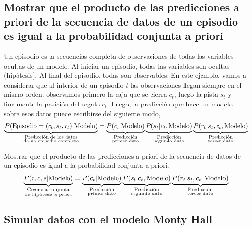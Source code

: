 \documentclass[a4paper,10pt]{article}
\begin{document}
%

\subsection{Mostrar que el producto de las predicciones a priori de la secuencia de datos de un episodio es igual a la probabilidad conjunta a priori}

Un episodio es la secuencias completa de observaciones de todas las variables ocultas de un modelo.
Al iniciar un episodio, todas las variables son ocultas (hipótesis).
Al final del episodio, todas son observables.
En este ejemplo, vamos a considerar que al interior de un episodio $t$ las observaciones llegan siempre en el mismo orden: observamos primero la caja que se cierra $c_t$, luego la pista $s_t$ y finalmente la posición del regalo $r_t$.
Luego, la predicción que hace un modelo sobre esos datos puede escribirse del siguiente modo,
$$\underbrace{P(\text{Episodio}= (c_t,s_t,r_t)|\text{Modelo})}_{\hfrac{\text{\scriptsize Predicción de los datos}}{\text{\scriptsize de un episodio completo}} }  = \underbrace{P(c_t|\text{Modelo})}_{\hfrac{\text{\scriptsize Predicción}}{\text{\scriptsize primer dato}} } \underbrace{P(s_t|c_t,\text{Modelo})}_{\hfrac{\text{\scriptsize Predicción}}{\text{\scriptsize segundo dato}} } \underbrace{P(r_t|s_t,c_t,\text{Modelo})}_{\hfrac{\text{\scriptsize Predicción}}{\text{\scriptsize tercer dato}} }$$

Mostrar que el producto de las predicciones a priori de la secuencia de datos de un episodio es igual a la probabilidad conjunta a priori.
$$  \underbrace{P (r, c, s| \text{Modelo})}_{\hfrac{\text{\scriptsize Creencia conjunta}}{\text{\scriptsize de hipótesis a priori}} }  = \underbrace{P(c_t|\text{Modelo})}_{\hfrac{\text{\scriptsize Predicción}}{\text{\scriptsize primer dato}} } \underbrace{P(s_t|c_t,\text{Modelo})}_{\hfrac{\text{\scriptsize Predicción}}{\text{\scriptsize segundo dato}} } \underbrace{P(r_t|s_t,c_t,\text{Modelo})}_{\hfrac{\text{\scriptsize Predicción}}{\text{\scriptsize tercer dato}} } $$


\subsection{Simular datos con el modelo Monty Hall}
\end{document}
